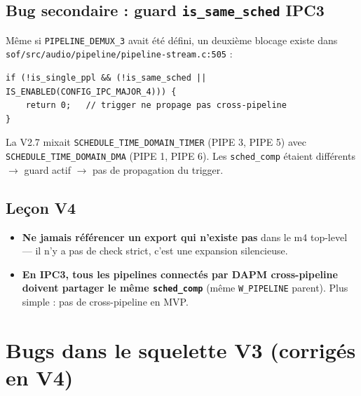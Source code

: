\documentclass[11pt,a4paper]{article}
\begin{document}
\subsection{Bug secondaire : guard \texttt{is\_same\_sched} IPC3}

Même si \texttt{PIPELINE\_DEMUX\_3} avait été défini, un deuxième blocage existe dans \texttt{sof/src/audio/pipeline/pipeline-stream.c:505} :
\begin{lstlisting}[basicstyle=\ttfamily\scriptsize]
if (!is_single_ppl && (!is_same_sched || IS_ENABLED(CONFIG_IPC_MAJOR_4))) {
    return 0;   // trigger ne propage pas cross-pipeline
}
\end{lstlisting}

La V2.7 mixait \texttt{SCHEDULE\_TIME\_DOMAIN\_TIMER} (PIPE 3, PIPE 5) avec \texttt{SCHEDULE\_TIME\_DOMAIN\_DMA} (PIPE 1, PIPE 6). Les \texttt{sched\_comp} étaient différents $\to$ guard actif $\to$ pas de propagation du trigger.

\subsection{Leçon V4}

\begin{itemize}[leftmargin=*, itemsep=1pt]
  \item \textbf{Ne jamais référencer un export qui n'existe pas} dans le m4 top-level --- il n'y a pas de check strict, c'est une expansion silencieuse.
  \item \textbf{En IPC3, tous les pipelines connectés par DAPM cross-pipeline doivent partager le même \texttt{sched\_comp}} (même \texttt{W\_PIPELINE} parent). Plus simple : pas de cross-pipeline en MVP.
\end{itemize}

\section{Bugs dans le squelette V3 (corrigés en V4)}\label{sec:bugs}
\end{document}
